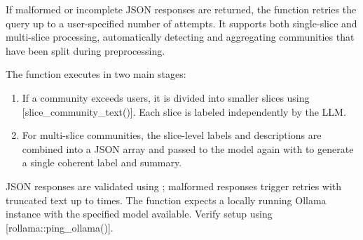 \documentclass[a4paper]{book}
\begin{document}
\begin{Details}
If malformed or incomplete JSON responses are returned, the function retries the query up to
a user-specified number of attempts. It supports both single-slice and multi-slice processing,
automatically detecting and aggregating communities that have been split during preprocessing.


The function executes in two main stages:
\begin{enumerate}

\item{}  If a community exceeds  users, it is divided
into smaller slices using [slice\_community\_text()]. Each slice is labeled independently by the LLM.
\item{}  For multi-slice communities, the slice-level labels and
descriptions are combined into a JSON array and passed to the model again with
 to generate a single coherent label and summary.

\end{enumerate}


JSON responses are validated using ; malformed responses trigger retries with truncated text
up to  times. The function expects a locally running Ollama instance with the specified
model available. Verify setup using [rollama::ping\_ollama()].
\end{Details}
%
\end{document}
